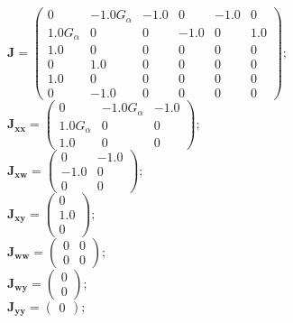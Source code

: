 \documentclass[11pt, oneside]{article}      %
\begin{document}
%
$ \mathbf{J} = \left(\begin{array}{cccccc}0 & - 1.0 G_{\alpha} & -1.0 & 0 & -1.0 & 0\\1.0 G_{\alpha} & 0 & 0 & -1.0 & 0 & 1.0\\1.0 & 0 & 0 & 0 & 0 & 0\\0 & 1.0 & 0 & 0 & 0 & 0\\1.0 & 0 & 0 & 0 & 0 & 0\\0 & -1.0 & 0 & 0 & 0 & 0\end{array}\right) ; $ 
%
\\
%
$ \mathbf{J_{xx}} = \left(\begin{array}{ccc}0 & - 1.0 G_{\alpha} & -1.0\\1.0 G_{\alpha} & 0 & 0\\1.0 & 0 & 0\end{array}\right) ; $ 
%
\\
%
$ \mathbf{J_{xw}} = \left(\begin{array}{cc}0 & -1.0\\-1.0 & 0\\0 & 0\end{array}\right) ; $ 
%
\\
%
$ \mathbf{J_{xy}} = \left(\begin{array}{c}0\\1.0\\0\end{array}\right) ; $ 
%
\\
%
$ \mathbf{J_{ww}} = \left(\begin{array}{cc}0 & 0\\0 & 0\end{array}\right) ; $ 
%
\\
%
$ \mathbf{J_{wy}} = \left(\begin{array}{c}0\\0\end{array}\right) ; $ 
%
\\
%
$ \mathbf{J_{yy}} = \left(\begin{array}{c}0\end{array}\right) ; $ 
%
\\
%
\end{document}
